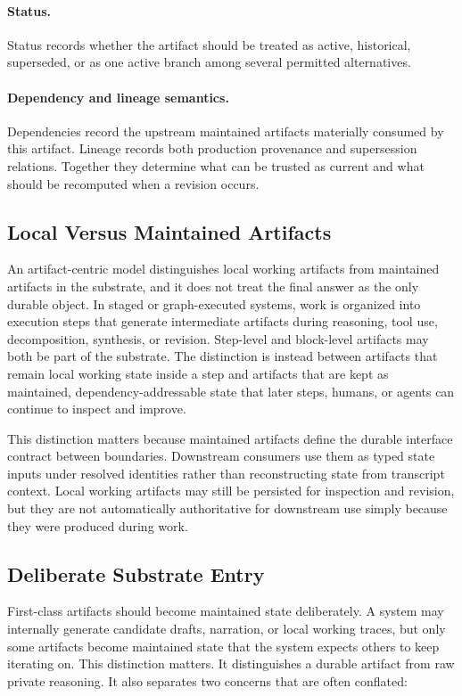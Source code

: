 \documentclass{article}
\begin{document}
\paragraph{Status.} Status records whether the artifact should be treated as active, historical, superseded, or as one active branch among several permitted alternatives.

\paragraph{Dependency and lineage semantics.} Dependencies record the upstream maintained artifacts materially consumed by this artifact. Lineage records both production provenance and supersession relations. Together they determine what can be trusted as current and what should be recomputed when a revision occurs.

\subsection{Local Versus Maintained Artifacts}

An artifact-centric model distinguishes local working artifacts from maintained artifacts in the substrate, and it does not treat the final answer as the only durable object. In staged or graph-executed systems, work is organized into execution steps that generate intermediate artifacts during reasoning, tool use, decomposition, synthesis, or revision. Step-level and block-level artifacts may both be part of the substrate. The distinction is instead between artifacts that remain local working state inside a step and artifacts that are kept as maintained, dependency-addressable state that later steps, humans, or agents can continue to inspect and improve.

This distinction matters because maintained artifacts define the durable interface contract between boundaries. Downstream consumers use them as typed state inputs under resolved identities rather than reconstructing state from transcript context. Local working artifacts may still be persisted for inspection and revision, but they are not automatically authoritative for downstream use simply because they were produced during work.

\subsection{Deliberate Substrate Entry}

First-class artifacts should become maintained state deliberately. A system may internally generate candidate drafts, narration, or local working traces, but only some artifacts become maintained state that the system expects others to keep iterating on. This distinction matters. It distinguishes a durable artifact from raw private reasoning. It also separates two concerns that are often conflated:
\end{document}
